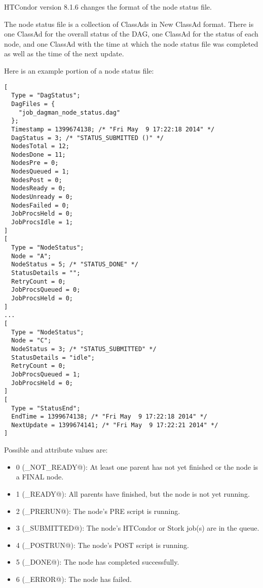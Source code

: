 \Note HTCondor version 8.1.6 changes the format of the node status
file.

The node status file is a collection of ClassAds in New ClassAd format.
There is one ClassAd for the overall status of the DAG, one ClassAd
for the status of each node, and one ClassAd with the time at which
the node status file was completed as well as the time of the next update.

Here is an example portion of a node status file:

\begin{verbatim}
[
  Type = "DagStatus";
  DagFiles = {
    "job_dagman_node_status.dag"
  };
  Timestamp = 1399674138; /* "Fri May  9 17:22:18 2014" */
  DagStatus = 3; /* "STATUS_SUBMITTED ()" */
  NodesTotal = 12;
  NodesDone = 11;
  NodesPre = 0;
  NodesQueued = 1;
  NodesPost = 0;
  NodesReady = 0;
  NodesUnready = 0;
  NodesFailed = 0;
  JobProcsHeld = 0;
  JobProcsIdle = 1;
]
[
  Type = "NodeStatus";
  Node = "A";
  NodeStatus = 5; /* "STATUS_DONE" */
  StatusDetails = "";
  RetryCount = 0;
  JobProcsQueued = 0;
  JobProcsHeld = 0;
]
...
[
  Type = "NodeStatus";
  Node = "C";
  NodeStatus = 3; /* "STATUS_SUBMITTED" */
  StatusDetails = "idle";
  RetryCount = 0;
  JobProcsQueued = 1;
  JobProcsHeld = 0;
]
[
  Type = "StatusEnd";
  EndTime = 1399674138; /* "Fri May  9 17:22:18 2014" */
  NextUpdate = 1399674141; /* "Fri May  9 17:22:21 2014" */
]
\end{verbatim}

Possible  and  attribute values are:

\begin{itemize}
\item 0 (\verb@STATUS_NOT_READY@): At least one parent has not yet finished
or the node is a FINAL node.
\item 1 (\verb@STATUS_READY@): All parents have finished, but the node is not
yet running.
\item 2 (\verb@STATUS_PRERUN@): The node's PRE script is running.
\item 3 (\verb@STATUS_SUBMITTED@): The node's HTCondor or Stork job(s) are in 
  the queue.
\item 4 (\verb@STATUS_POSTRUN@): The node's POST script is running.
\item 5 (\verb@STATUS_DONE@): The node has completed successfully.
\item 6 (\verb@STATUS_ERROR@): The node has failed.
\end{itemize}

